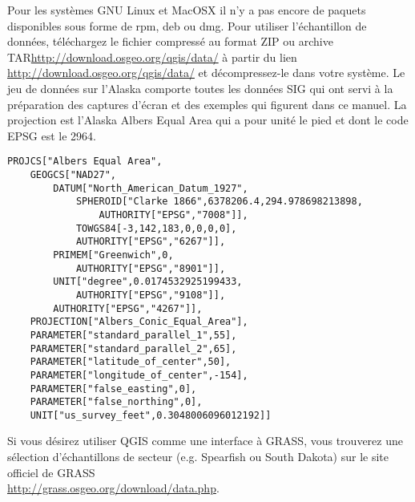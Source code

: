 \nix \osx Pour les systèmes GNU Linux et MacOSX il n'y a pas encore de paquets disponibles sous forme de rpm, deb ou dmg. Pour utiliser l'échantillon de données, téléchargez le fichier compressé au format ZIP ou archive TAR\url{http://download.osgeo.org/qgis/data/}
à partir du lien \url{http://download.osgeo.org/qgis/data/} et décompressez-le dans votre système. Le jeu de données sur l'Alaska comporte toutes les données SIG qui ont servi à la préparation des captures d'écran et des exemples qui figurent dans ce manuel. La projection
est l'Alaska Albers Equal Area qui a pour unité le pied et dont le code EPSG est le 2964.


\begin{verbatim}
PROJCS["Albers Equal Area",
    GEOGCS["NAD27",
        DATUM["North_American_Datum_1927",
            SPHEROID["Clarke 1866",6378206.4,294.978698213898,
                AUTHORITY["EPSG","7008"]],
            TOWGS84[-3,142,183,0,0,0,0],
            AUTHORITY["EPSG","6267"]],
        PRIMEM["Greenwich",0,
            AUTHORITY["EPSG","8901"]],
        UNIT["degree",0.0174532925199433,
            AUTHORITY["EPSG","9108"]],
        AUTHORITY["EPSG","4267"]],
    PROJECTION["Albers_Conic_Equal_Area"],
    PARAMETER["standard_parallel_1",55],
    PARAMETER["standard_parallel_2",65],
    PARAMETER["latitude_of_center",50],
    PARAMETER["longitude_of_center",-154],
    PARAMETER["false_easting",0],
    PARAMETER["false_northing",0],
    UNIT["us_survey_feet",0.3048006096012192]]
\end{verbatim}


Si vous désirez utiliser QGIS comme une interface à GRASS, vous trouverez une sélection d'échantillons
de secteur (e.g. Spearfish ou South Dakota) sur le site officiel de GRASS \\
\url{http://grass.osgeo.org/download/data.php}. 



